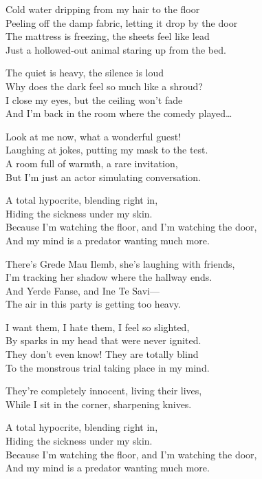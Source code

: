 \begin{lyrics}
Cold water dripping from my hair to the floor\\
Peeling off the damp fabric, letting it drop by the door\\
The mattress is freezing, the sheets feel like lead\\
Just a hollowed-out animal staring up from the bed.

The quiet is heavy, the silence is loud\\
Why does the dark feel so much like a shroud?\\
I close my eyes, but the ceiling won’t fade\\
And I’m back in the room where the comedy played…

Look at me now, what a wonderful guest!\\
Laughing at jokes, putting my mask to the test.\\
A room full of warmth, a rare invitation,\\
But I’m just an actor simulating conversation.

A total hypocrite, blending right in,\\
Hiding the sickness under my skin.\\
Because I’m watching the floor, and I’m watching the door,\\
And my mind is a predator wanting much more.

There’s Grede Mau Ilemb, she’s laughing with friends,\\
I’m tracking her shadow where the hallway ends.\\
And Yerde Fanse, and Ine Te Savi—\\
The air in this party is getting too heavy.

I want them, I hate them, I feel so slighted,\\
By sparks in my head that were never ignited.\\
They don’t even know! They are totally blind\\
To the monstrous trial taking place in my mind.

They’re completely innocent, living their lives,\\
While I sit in the corner, sharpening knives.

A total hypocrite, blending right in,\\
Hiding the sickness under my skin.\\
Because I’m watching the floor, and I’m watching the door,\\
And my mind is a predator wanting much more.


\end{lyrics}

